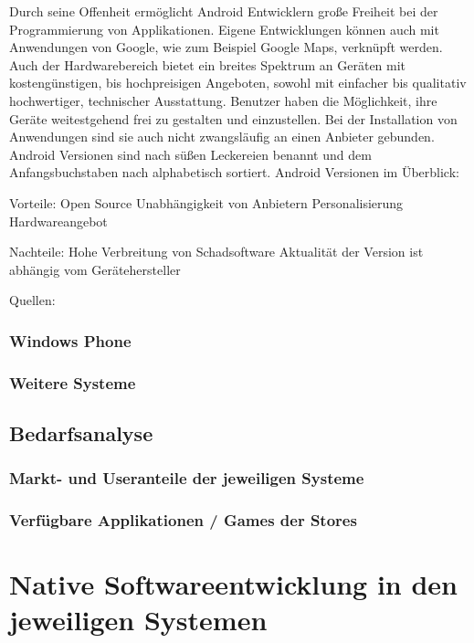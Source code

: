 Durch seine Offenheit ermöglicht Android Entwicklern große Freiheit bei der Programmierung von Applikationen. Eigene Entwicklungen können auch mit Anwendungen von Google, wie zum Beispiel Google Maps, verknüpft werden.
Auch der Hardwarebereich bietet ein breites Spektrum an Geräten mit kostengünstigen, bis hochpreisigen Angeboten, sowohl mit einfacher bis qualitativ hochwertiger, technischer Ausstattung. Benutzer haben die Möglichkeit, ihre Geräte weitestgehend frei zu gestalten und einzustellen. Bei der Installation von Anwendungen sind sie auch nicht zwangsläufig an einen Anbieter gebunden.
Android Versionen sind nach süßen Leckereien benannt und dem Anfangsbuchstaben nach alphabetisch sortiert.
Android Versionen im Überblick:

Vorteile:
Open Source
Unabhängigkeit von Anbietern
Personalisierung
Hardwareangebot

Nachteile:
Hohe Verbreitung von Schadsoftware
Aktualität der Version ist abhängig vom Gerätehersteller

Quellen:

\subsection{Windows Phone}
\subsection{Weitere Systeme}

\section{Bedarfsanalyse}
\subsection{Markt- und Useranteile der jeweiligen Systeme}
\subsection{Verfügbare Applikationen / Games der Stores}

\chapter{Native Softwareentwicklung in den jeweiligen Systemen}
